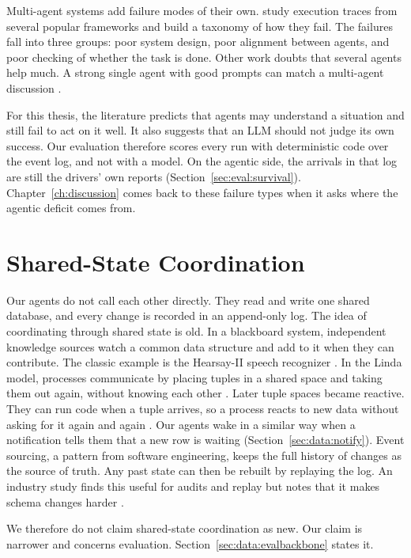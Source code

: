Multi-agent systems add failure modes of their own. \textcite{cemri2025} study
execution traces from several popular frameworks and build a taxonomy of how
they fail. The failures fall into three groups: poor system design, poor
alignment between agents, and poor checking of whether the task is done.
Other work doubts that several agents help much. A strong single agent
with good prompts can match a multi-agent discussion \parencite{wang2024}.

For this thesis, the literature predicts that agents may understand a
situation and still fail to act on it well. It also suggests that an LLM
should not judge its own success. Our evaluation therefore
scores every run with deterministic code over the event log, and not with a
model. On the agentic side, the arrivals in that log are still the drivers'
own reports (Section~\ref{sec:eval:survival}). Chapter~\ref{ch:discussion} comes back to these failure types when it asks
where the agentic deficit comes from.

\section{Shared-State Coordination}
\label{sec:bg:dbcentric}

Our agents do not call each other directly. They read and write one shared
database, and every change is recorded in an append-only log. The idea of
coordinating through shared state is old. In a blackboard system, independent
knowledge sources watch a common data structure and add to it when they can
contribute. The classic example is the Hearsay-II speech recognizer
\parencite{nii1986}. In the Linda model, processes communicate by
placing tuples in a shared space and taking them out again, without knowing
each other \parencite{gelernter1985}. Later tuple spaces became reactive. They
can run code when a tuple arrives, so a process reacts to new data without
asking for it again and again \parencite{omicini1999}. Our agents
wake in a similar way when a notification tells them that a new row is waiting
(Section~\ref{sec:data:notify}). Event sourcing, a pattern from software
engineering, keeps the full history of changes as the source of truth. Any
past state can then be rebuilt by replaying the log. An industry study finds
this useful for audits and replay but notes that it makes schema changes harder
\parencite{overeem2021}.

We therefore do not claim shared-state coordination as new. Our claim is
narrower and concerns evaluation. Section~\ref{sec:data:evalbackbone} states it.

